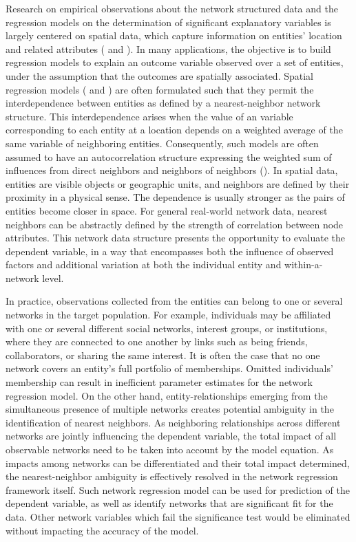 \documentclass[times, doublespace]{auth}
\begin{document}
Research on empirical observations about the network structured data and the regression models on the determination of significant explanatory variables is largely centered on spatial data, which capture information on entities' location and related attributes (\cite{R24} and \cite{R29}). In many applications, the objective is to build regression models to explain an outcome variable observed over a set of entities, under the assumption that the outcomes are spatially associated. Spatial regression models (\cite{R5} and \cite{R6}) are often formulated such that they permit the interdependence between entities as defined by a nearest-neighbor network structure. This interdependence arises when the value of an variable corresponding to each entity at a location depends on a weighted average of the same variable of neighboring entities. Consequently, such models are often assumed to have an autocorrelation structure expressing the weighted sum of influences from direct neighbors and neighbors of neighbors (\cite{R29}). In spatial data, entities are visible objects or geographic units, and neighbors are defined by their proximity in a physical sense. The dependence is usually stronger as the pairs of entities become closer in space. For general real-world network data, nearest neighbors can be abstractly defined by the strength of correlation between node attributes. This network data structure presents the opportunity to evaluate the dependent variable, in a way that encompasses both the influence of observed factors and additional variation at both the individual entity and within-a-network level.
\newline

In practice, observations collected from the entities can belong to one or several networks in the target population. For example, individuals may be affiliated with one or several different social networks, interest groups, or institutions, where they are connected to one another by links such as being friends, collaborators, or sharing the same interest. It is often the case that no one network covers an entity's full portfolio of memberships. Omitted individuals' membership can result in inefficient parameter estimates for the network regression model. On the other hand, entity-relationships emerging from the simultaneous presence of multiple networks creates potential ambiguity in the identification of nearest neighbors. As neighboring relationships across different networks are jointly influencing the dependent variable, the total impact of all observable networks need to be taken into account by the model equation. As impacts among networks can be differentiated and their total impact determined, the nearest-neighbor ambiguity is effectively resolved in the network regression framework itself. Such network regression model can be used for prediction of the dependent variable, as well as identify networks that are significant fit for the data. Other network variables which fail the significance test would be eliminated without impacting the accuracy of the model. 
\newline
\end{document}
